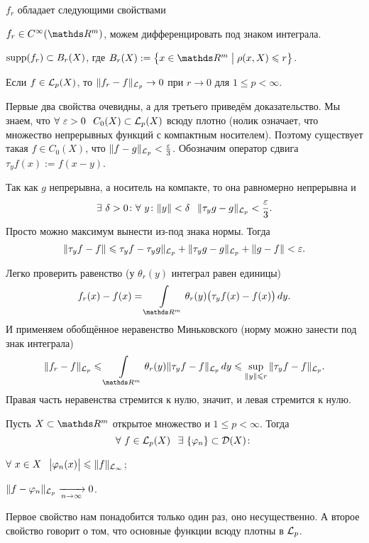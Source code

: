 $f_r$ обладает следующими свойствами
\begin{roItems}
\item $f_r\in C^\infty(\R^m)$, можем дифференцировать под знаком интеграла.
\item $\operatorname{supp}(f_r)\subset B_r(X)$, где $B_r(X) := \big\{x\in \R^m\bigm|\rho(x,X)\le r\big\}$.
\item Если $f\in\mathcal L_p(X)$, то $\|f_r-f\|_{\mathcal L_p}\rightarrow0$ при $r\to0$ для $1\le p<\infty$.
\end{roItems}
\begin{Proof}
	Первые два свойства очевидны, а для третьего приведём доказательство. Мы знаем, что $\forall\ \e>0\pau C_0(X)\subset \L_p(X)$ всюду плотно (нолик означает, что множество непрерывных функций с компактным носителем). Поэтому существует такая $f\in C_0(X)$, что $\|f-g\|_{\mathcal L_p}<\frac{\varepsilon}3$.
	Обозначим оператор сдвига $\tau_y f(x):=f(x-y)$.

	Так как $g$ непрерывна, а носитель на компакте, то она равномерно непрерывна и
	\[
		\exists\ \delta>0\colon \forall\ y\colon \|y\|<\delta\hskip .75em plus.1em minus.08em\relax \|\tau_yg-g\|_{\mathcal L_p}<\frac{\varepsilon}3.
	\]
	Просто можно максимум вынести из-под знака нормы. Тогда
	\[
		\|\tau_yf-f\|\leqslant\tau_yf-\tau_yg\|_{\mathcal L_p} + \|\tau_yg-g\|_{\mathcal L_p} + \|g-f\|<\varepsilon.
	\]

	Легко проверить равенство (у $\theta_r(y)$ интеграл равен единицы)
	\[
  f_r(x) - f(x) = \Gint{\R^m}\theta_r(y)\big(\tau_yf(x)-f(x)\big)\,dy.
	\]
	И применяем обобщённое неравенство Миньковского (норму можно занести под знак интеграла)
	\[
  \|f_r-f\|_{\L_p}\le \Gint{\R^m}\theta_r(y)\|\tau_yf-f\|_{\L_p}\,dy\le\sup\limits_{\|y\|\le r}\|\tau_y f - f\|_{\L_p}.
	\]
	Правая часть неравенства стремится к нулю, значит, и левая стремится к нулю.
\end{Proof}
\begin{Lem}[о плотности]
	Пусть $X\subset \R^m$ открытое множество и $1\le p<\infty$. Тогда
	\[
	  \forall\ f\in\L_p(X)\pau\exists\ \{\phi_n\}\subset\D(X)\colon
	\]
	\begin{azItems}
	\item $\forall\ x\in X\pau \big|\phi_n(x)\big|\le\|f\|_{\L_\infty}$;
	\item $\|f-\varphi_n\|_{\mathcal L_p}\xrightarrow[n\rightarrow\infty]{}0$.
	\end{azItems}
\end{Lem}
Первое свойство нам понадобится только один раз, оно несущественно. А второе свойство говорит о том, что основные функции всюду плотны в $\mathcal L_p$.
